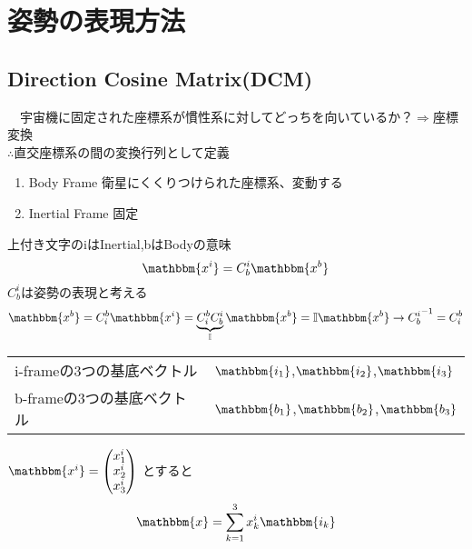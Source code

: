\documentclass[class=article, crop=false, preview=false, dvipdfmx, a4paper]{standalone}
\begin{document}
\section{姿勢の表現方法}

\subsection{Direction Cosine Matrix(DCM)}
　宇宙機に固定された座標系が慣性系に対してどっちを向いているか？$\Rightarrow$座標変換\\
 $\therefore$直交座標系の間の変換行列として定義
\begin{enumerate}[label = \maru{\theenumi}]
 \item Body Frame 衛星にくくりつけられた座標系、変動する 
 \item Inertial Frame 固定
 \end{enumerate}
 上付き文字のiはInertial,bはBodyの意味
 \[ \mathbbm{x^i}=C^i_b\mathbbm{x^b} \]
 $C^i_b$は姿勢の表現と考える
 \[ \mathbbm{x^b} = C^b_i \mathbbm{x^i} = \underbrace{C^b_i C^i_b}_{\mathbb{I}} \mathbbm{x^b} = \mathbb{I} \mathbbm{x^b}
 	\rightarrow {C^i_b}^{-1} = C^b_i \]

\begin{tabular}{ll}
i-frameの3つの基底ベクトル & $\mathbbm{i_1}$,$\mathbbm{i_2}$,$\mathbbm{i_3}$ \\
b-frameの3つの基底ベクトル & $\mathbbm{b_1}$,$\mathbbm{b_2}$,$\mathbbm{b_3}$
\end{tabular}

$\mathbbm{x^i}=
 	\begin{pmatrix}
    	x^i_1\\
        x^i_2\\
        x^i_3\\
    \end{pmatrix}$
とすると
\begin{equation}
\mathbbm{x} = \sum_{k=1}^{3} x^i_k \mathbbm{i_k} \label{eq:1}
\end{equation}
\end{document}
